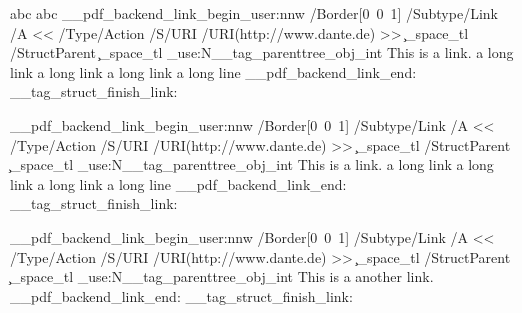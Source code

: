 \documentclass{article}
\begin{document}
\leavevmode
{}
abc
\tagmcend
{}
abc
\tagmcend
{}
\ExplSyntaxOn\makeatletter
\leavevmode\__pdf_backend_link_begin_user:nnw
     {/Border[0~0~1]}
     {
          /Subtype/Link%
          /A
           <<
            /Type/Action
            /S/URI
            /URI(http://www.dante.de)
           >>
         \c_space_tl
         /StructParent \c_space_tl \int_use:N\c@g__tag_parenttree_obj_int
     }
    This is a link. a long link a long link a long link a long line
\__pdf_backend_link_end:
\__tag_struct_finish_link:
\ExplSyntaxOff
\tagmcend
\tagstructend

\ExplSyntaxOn\makeatletter
\leavevmode\__pdf_backend_link_begin_user:nnw
     {/Border[0~0~1]}
     {
          /Subtype/Link%
          /A
           <<
            /Type/Action
            /S/URI
            /URI(http://www.dante.de)
           >>
         \c_space_tl
         /StructParent \c_space_tl \int_use:N\c@g__tag_parenttree_obj_int
     }
    This is a link. a long link a long link a long link a long line
\__pdf_backend_link_end:
\__tag_struct_finish_link: %
\ExplSyntaxOff
\tagmcend
\tagstructend

\ExplSyntaxOn\makeatletter
\leavevmode\__pdf_backend_link_begin_user:nnw
    {/Border[0~0~1]}
    {
          /Subtype/Link%
          /A
           <<
            /Type/Action
            /S/URI
            /URI(http://www.dante.de)
           >>
         \c_space_tl
         /StructParent \c_space_tl \int_use:N\c@g__tag_parenttree_obj_int
    }
    This is a another link.
\__pdf_backend_link_end:
\__tag_struct_finish_link:
\ExplSyntaxOff
\tagmcend
\tagstructend
\tagstructend
\tagstructend
\end{document}

